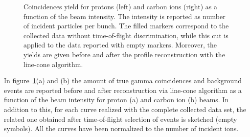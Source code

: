 \begin{figure} [!h]
  \caption{Coincidences yield for protons (left) and carbon ions (right) as a function of the beam intensity. The intensity is reported as number of incident particles per bunch. The filled markers correspond to the collected data without time-of-flight discrimination, while this cut is applied to the data reported with empty markers. Moreover, the yields are given before and after the profile reconstruction with the line-cone algorithm.}
  \label{fig:coincidences}
\end{figure}

In figure~\ref{fig:coincidences}(a) and (b) the amount of true gamma coincidences and background events are reported before and after reconstruction via line-cone algorithm as a function of the beam intensity for proton (a) and carbon ion (b) beams. In addition to this, for each curve realized with the complete collected data set, the related one obtained after time-of-flight selection of events is sketched (empty symbols). All the curves have been normalized to the number of incident ions.

